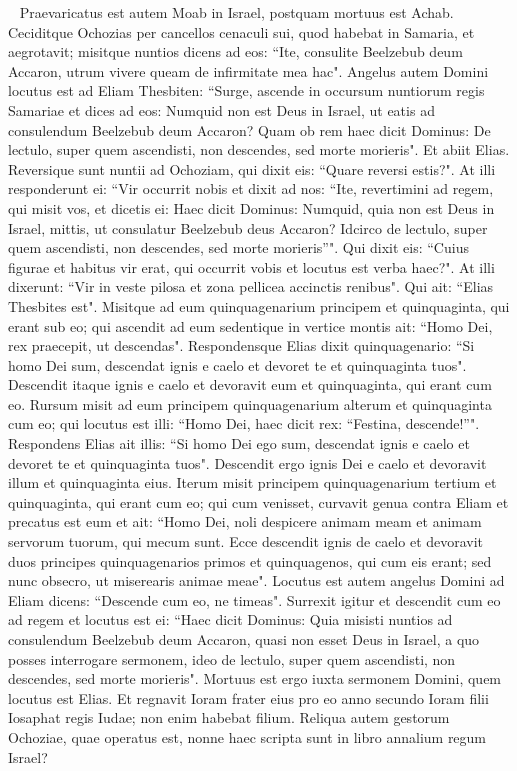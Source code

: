 
\begin{biblechapter}  
\verse Praevaricatus est autem Moab in Israel, postquam mortuus est Achab. 
\verse Ceciditque Ochozias per cancellos cenaculi sui, quod habebat in Samaria, et aegrotavit; misitque nuntios dicens ad eos: “Ite, consulite Beelzebub deum Accaron, utrum vivere queam de infirmitate mea hac". 
\verse Angelus autem Domini locutus est ad Eliam Thesbiten: “Surge, ascende in occursum nuntiorum regis Samariae et dices ad eos: Numquid non est Deus in Israel, ut eatis ad consulendum Beelzebub deum Accaron? 
\verse Quam ob rem haec dicit Dominus: De lectulo, super quem ascendisti, non descendes, sed morte morieris". Et abiit Elias. 
\verse Reversique sunt nuntii ad Ochoziam, qui dixit eis: “Quare reversi estis?". 
\verse At illi responderunt ei: “Vir occurrit nobis et dixit ad nos: “Ite, revertimini ad regem, qui misit vos, et dicetis ei: Haec dicit Dominus: Numquid, quia non est Deus in Israel, mittis, ut consulatur Beelzebub deus Accaron? Idcirco de lectulo, super quem ascendisti, non descendes, sed morte morieris”". 
\verse Qui dixit eis: “Cuius figurae et habitus vir erat, qui occurrit vobis et locutus est verba haec?". 
\verse At illi dixerunt: “Vir in veste pilosa et zona pellicea accinctis renibus". Qui ait: “Elias Thesbites est". 
\verse Misitque ad eum quinquagenarium principem et quinquaginta, qui erant sub eo; qui ascendit ad eum sedentique in vertice montis ait: “Homo Dei, rex praecepit, ut descendas". 
\verse Respondensque Elias dixit quinquagenario: “Si homo Dei sum, descendat ignis e caelo et devoret te et quinquaginta tuos". Descendit itaque ignis e caelo et devoravit eum et quinquaginta, qui erant cum eo. 
\verse Rursum misit ad eum principem quinquagenarium alterum et quinquaginta cum eo; qui locutus est illi: “Homo Dei, haec dicit rex: “Festina, descende!”". 
\verse Respondens Elias ait illis: “Si homo Dei ego sum, descendat ignis e caelo et devoret te et quinquaginta tuos". Descendit ergo ignis Dei e caelo et devoravit illum et quinquaginta eius. 
\verse Iterum misit principem quinquagenarium tertium et quinquaginta, qui erant cum eo; qui cum venisset, curvavit genua contra Eliam et precatus est eum et ait: “Homo Dei, noli despicere animam meam et animam servorum tuorum, qui mecum sunt. 
\verse Ecce descendit ignis de caelo et devoravit duos principes quinquagenarios primos et quinquagenos, qui cum eis erant; sed nunc obsecro, ut miserearis animae meae". 
\verse Locutus est autem angelus Domini ad Eliam dicens: “Descende cum eo, ne timeas". Surrexit igitur et descendit cum eo ad regem 
\verse et locutus est ei: “Haec dicit Dominus: Quia misisti nuntios ad consulendum Beelzebub deum Accaron, quasi non esset Deus in Israel, a quo posses interrogare sermonem, ideo de lectulo, super quem ascendisti, non descendes, sed morte morieris". 
\verse Mortuus est ergo iuxta sermonem Domini, quem locutus est Elias. Et regnavit Ioram frater eius pro eo anno secundo Ioram filii Iosaphat regis Iudae; non enim habebat filium. 
\verse Reliqua autem gestorum Ochoziae, quae operatus est, nonne haec scripta sunt in libro annalium regum Israel? 
\end{biblechapter}

